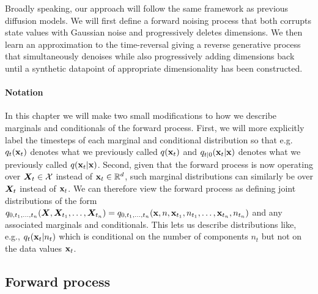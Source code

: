 Broadly speaking, our approach will follow the same framework as previous diffusion models. We will first define a forward noising process that both corrupts state values with Gaussian noise and progressively deletes dimensions.
We then learn an approximation to the time-reversal giving a reverse generative process that simultaneously denoises while also progressively adding dimensions back until a synthetic datapoint of appropriate dimensionality has been constructed.

\paragraph{Notation}
In this chapter we will make two small modifications to how we describe marginals and conditionals of the forward process. First, we will more explicitly label the timesteps of each marginal and conditional distribution so that e.g. $q_t({\mathbf{x}}_t)$ denotes what we previously called $q({\mathbf{x}}_t)$ and $q_{t|0}({\mathbf{x}}_t|{\mathbf{x}})$ denotes what we previously called $q({\mathbf{x}}_t|{\mathbf{x}})$. Second, given that the forward process is now operating over ${\bm{X}}_t \in {\mathcal{X}}$ instead of ${\mathbf{x}}_t \in \mathbb{R}^{d}$, such marginal distributions can similarly be over ${\bm{X}}_t$ instead of ${\mathbf{x}}_t$. We can therefore view the forward process as defining joint distributions of the form $q_{0,t_1,\ldots,t_n}({\bm{X}},{\bm{X}}_{t_1},\ldots,{\bm{X}}_{t_n}) = q_{0,t_1,\ldots,t_n}({\mathbf{x}},n,{\mathbf{x}}_{t_1},n_{t_1},\ldots,{\mathbf{x}}_{t_n},n_{t_n})$ and any associated marginals and conditionals. This lets us describe distributions like, e.g., $q_t({\mathbf{x}}_t|n_t)$ which is conditional on the number of components $n_t$ but not on the data values ${\mathbf{x}}_t$.

\subsection{Forward process}
\label{sec:tddm-jump-diff-proc}

